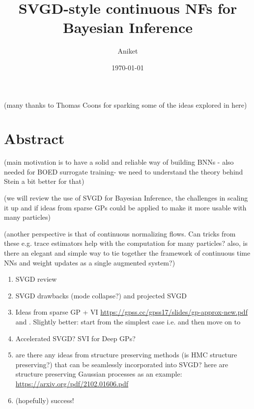 \documentclass[12pt]{article}
\title{SVGD-style continuous NFs for Bayesian Inference}
\author{Aniket}
\date{\today}
\renewcommand{\[}{\left[}
\renewcommand{\]}{\right]}
\renewcommand{\(}{\left(}
\renewcommand{\)}{\right)}
\begin{document}
\maketitle

(many thanks to Thomas Coons for sparking some of the ideas explored in here)

\section{Abstract}

(main motivation is to have a solid and reliable way of building BNNs - also needed for BOED surrogate training-  we need to understand the theory behind Stein a bit better for that)

(we will review the use of SVGD for Bayesian Inference, the challenges in scaling it up and if ideas from sparse GPs could be applied to make it more usable with many particles)

(another perspective is that of continuous normalizing flows. Can tricks from these e.g. trace estimators help with the computation for many particles? also, is there an elegant and simple way to tie together the framework of continuous time NNs and weight updates as a single augmented system?)

\begin{enumerate}
    \item SVGD review \cite{liu_short_2016,liu_kernelized_2016,liu_stein_2019}

    \item SVGD drawbacks (mode collapse?) and projected SVGD \cite{chen_projected_2020}

    \item Ideas from sparse GP + VI \url{https://gpss.cc/gpss17/slides/gp-approx-new.pdf} and \cite{noack_unifying_2023}. Slightly better: start from the simplest case i.e. \cite{snelson_sparse_2005} and then move on to \cite{titsias_variational_2009,titsias_bayesian_2010}

    \item Accelerated SVGD? SVI for Deep GPs? \cite{hoffman_stochastic_2013}

    \item are there any ideas from structure preserving methods (is HMC structure preserving?) that can be seamlessly incorporated into SVGD? here are structure preserving Gaussian processes as an example: \url{https://arxiv.org/pdf/2102.01606.pdf}
    
    \item (hopefully) success!
\end{enumerate}
\end{document}
